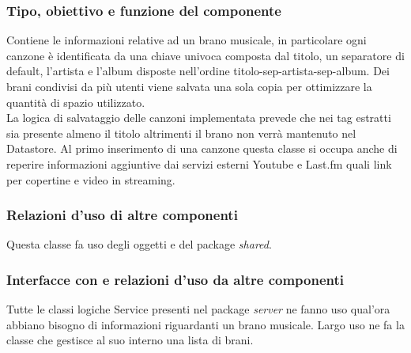 \subsubsection*{Tipo, obiettivo e funzione del componente} Contiene le
informazioni relative ad un brano musicale, in particolare ogni canzone \`e
identificata da una chiave univoca composta dal titolo, un separatore di
default, l'artista e l'album disposte nell'ordine titolo-sep-artista-sep-album.
Dei brani condivisi da pi\`u utenti viene salvata una sola copia per ottimizzare
la quantit\`a di spazio utilizzato.\\
La logica di salvataggio delle canzoni implementata prevede che nei tag estratti
sia presente almeno il titolo altrimenti il brano non verrà mantenuto nel
Datastore. Al primo inserimento di una canzone questa classe si occupa anche di
reperire informazioni aggiuntive dai servizi esterni Youtube e Last.fm quali link per copertine e video in streaming. \subsubsection*{Relazioni d'uso di altre componenti} Questa classe fa uso degli
oggetti  e  del package \emph{shared}. 
\subsubsection*{Interfacce con e relazioni d'uso da altre componenti} Tutte le classi logiche Service presenti nel package
\emph{server} ne fanno uso qual'ora abbiano bisogno di informazioni riguardanti
un brano musicale. Largo uso ne fa la classe  che gestisce al
suo interno una lista di brani. 
